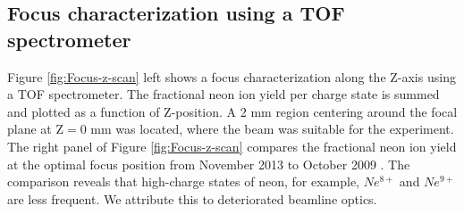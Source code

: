 \subsection{Focus characterization using a TOF spectrometer}
%
Figure \ref{fig:Focus-z-scan} left shows a focus characterization along the Z-axis using a TOF spectrometer. The fractional neon ion yield per charge state is summed and plotted as a function of Z-position. A 2 mm region centering around the focal plane at $\text{Z}=0$ mm was located, where the beam was suitable for the experiment. The right panel of Figure \ref{fig:Focus-z-scan} compares the fractional neon ion yield at the optimal focus position from November 2013 \citep{Bucher-2016-Unpublished} to October 2009 \citep{Doumy-2011-PRL}. The comparison reveals that high-charge states of neon, for example, $Ne^{8+}$ and $Ne^{9+}$ are less frequent. We attribute this to deteriorated beamline optics.\\
